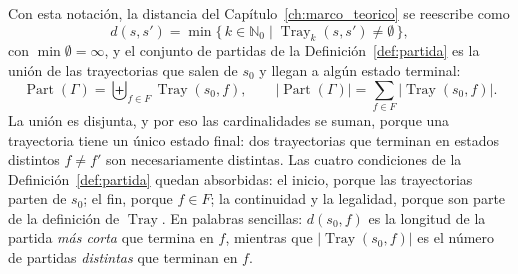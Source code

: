 Con esta notación, la distancia del Capítulo~\ref{ch:marco_teorico} se reescribe como
\begin{equation}
    d(s, s') = \min\{\, k \in \mathbb N_0 \mid \operatorname{Tray}_k(s, s') \neq \emptyset \,\},
    \label{eq:an_distancia_tray}
\end{equation}
con $\min \emptyset = \infty$, y el conjunto de partidas de la Definición~\ref{def:partida} es la unión de las trayectorias que salen de $s_0$ y llegan a algún estado terminal:
\begin{equation}
    \operatorname{Part}(\Gamma) = \biguplus_{f \in F} \operatorname{Tray}(s_0, f),
    \qquad
    |\operatorname{Part}(\Gamma)| = \sum_{f \in F} |\operatorname{Tray}(s_0, f)|.
    \label{eq:an_part_tray}
\end{equation}
La unión es disjunta, y por eso las cardinalidades se suman, porque una trayectoria tiene un único estado final: dos trayectorias que terminan en estados distintos $f \neq f'$ son necesariamente distintas. Las cuatro condiciones de la Definición~\ref{def:partida} quedan absorbidas: el inicio, porque las trayectorias parten de $s_0$; el fin, porque $f \in F$; la continuidad y la legalidad, porque son parte de la definición de $\operatorname{Tray}$. En palabras sencillas: $d(s_0, f)$ es la longitud de la partida \emph{más corta} que termina en $f$, mientras que $|\operatorname{Tray}(s_0, f)|$ es el número de partidas \emph{distintas} que terminan en $f$.

